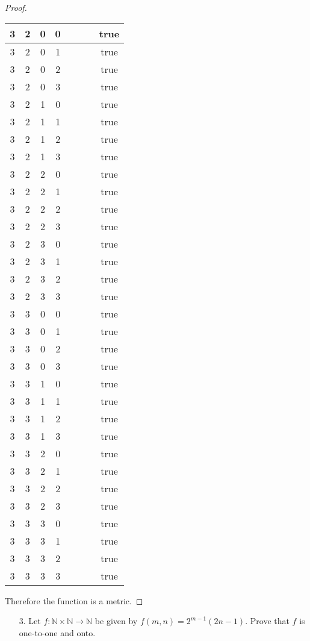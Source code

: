 \documentclass[10pt]{article}
\theoremstyle{definition}
\theoremstyle{plain}
\newcommand{\N}{\mathbb{N}}
\begin{document}
\begin{proof}
\begin{longtable}{|c|c|c|c|c|c|c|c|}
      3 & 2 & 0 & 0 &  &  &  & true \tabularnewline \hline
      3 & 2 & 0 & 1 &  &  &  & true \tabularnewline \hline
      3 & 2 & 0 & 2 &  &  &  & true \tabularnewline \hline
      3 & 2 & 0 & 3 &  &  &  & true \tabularnewline \hline
      3 & 2 & 1 & 0 &  &  &  & true \tabularnewline \hline
      3 & 2 & 1 & 1 &  &  &  & true \tabularnewline \hline
      3 & 2 & 1 & 2 &  &  &  & true \tabularnewline \hline
      3 & 2 & 1 & 3 &  &  &  & true \tabularnewline \hline
      3 & 2 & 2 & 0 &  &  &  & true \tabularnewline \hline
      3 & 2 & 2 & 1 &  &  &  & true \tabularnewline \hline
      3 & 2 & 2 & 2 &  &  &  & true \tabularnewline \hline
      3 & 2 & 2 & 3 &  &  &  & true \tabularnewline \hline
      3 & 2 & 3 & 0 &  &  &  & true \tabularnewline \hline
      3 & 2 & 3 & 1 &  &  &  & true \tabularnewline \hline
      3 & 2 & 3 & 2 &  &  &  & true \tabularnewline \hline
      3 & 2 & 3 & 3 &  &  &  & true \tabularnewline \hline
      3 & 3 & 0 & 0 &  &  &  & true \tabularnewline \hline
      3 & 3 & 0 & 1 &  &  &  & true \tabularnewline \hline
      3 & 3 & 0 & 2 &  &  &  & true \tabularnewline \hline
      3 & 3 & 0 & 3 &  &  &  & true \tabularnewline \hline
      3 & 3 & 1 & 0 &  &  &  & true \tabularnewline \hline
      3 & 3 & 1 & 1 &  &  &  & true \tabularnewline \hline
      3 & 3 & 1 & 2 &  &  &  & true \tabularnewline \hline
      3 & 3 & 1 & 3 &  &  &  & true \tabularnewline \hline
      3 & 3 & 2 & 0 &  &  &  & true \tabularnewline \hline
      3 & 3 & 2 & 1 &  &  &  & true \tabularnewline \hline
      3 & 3 & 2 & 2 &  &  &  & true \tabularnewline \hline
      3 & 3 & 2 & 3 &  &  &  & true \tabularnewline \hline
      3 & 3 & 3 & 0 &  &  &  & true \tabularnewline \hline
      3 & 3 & 3 & 1 &  &  &  & true \tabularnewline \hline
      3 & 3 & 3 & 2 &  &  &  & true \tabularnewline \hline
      3 & 3 & 3 & 3 &  &  &  & true \tabularnewline \hline
    \end{longtable}

  Therefore the function is a metric.
\end{proof}



\pagebreak



\begin{enumerate}
\item[3.] Let $f: \N \times \N \to \N$ be given by $f(m,n) = 2^{m-1}(2n-1)$.  Prove that $f$ is one-to-one and onto.
\end{enumerate}
\end{document}
